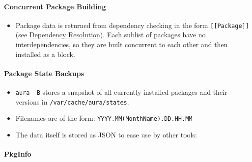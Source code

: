 \documentclass{article}
\begin{document}
\paragraph{Concurrent Package
Building}\label{concurrent-package-building}

\begin{itemize}
\itemsep1pt\parskip0pt
\item
  Package data is returned from dependency checking in the form
  \texttt{{[}{[}Package{]}{]}} (see
  \href{/DESIGN.md\#dependency-resolution}{Dependency Resolution}). Each
  sublist of packages have no interdependencies, so they are built
  concurrent to each other and then installed as a block.
\end{itemize}

\paragraph{Package State Backups}\label{package-state-backups}

\begin{itemize}
\itemsep1pt\parskip0pt
\item
  \texttt{aura -B} stores a snapshot of all currently installed packages
  and their versions in \texttt{/var/cache/aura/states}.
\item
  Filenames are of the form: \texttt{YYYY.MM(MonthName).DD.HH.MM}
\item
  The data itself is stored as JSON to ease use by other tools:
\end{itemize}

\begin{Shaded}
\begin{Highlighting}[]
\NormalTok{\{ }\NormalTok{: }
\NormalTok{, }\NormalTok{: }
\NormalTok{, }\NormalTok{: [ \{ }\NormalTok{: }
                \NormalTok{, }\NormalTok{: } \NormalTok{\}}
              \NormalTok{]}
\NormalTok{\}}
\end{Highlighting}
\end{Shaded}

\paragraph{PkgInfo}\label{pkginfo}
\end{document}
